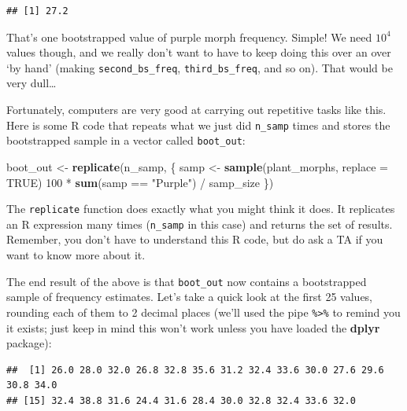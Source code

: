 \documentclass[]{book}
\newenvironment{Shaded}{\begin{snugshade}}{\end{snugshade}}
\newcommand{\KeywordTok}[1]{\textcolor[rgb]{0.13,0.29,0.53}{\textbf{{#1}}}}
\newcommand{\DataTypeTok}[1]{\textcolor[rgb]{0.13,0.29,0.53}{{#1}}}
\newcommand{\DecValTok}[1]{\textcolor[rgb]{0.00,0.00,0.81}{{#1}}}
\newcommand{\StringTok}[1]{\textcolor[rgb]{0.31,0.60,0.02}{{#1}}}
\newcommand{\OtherTok}[1]{\textcolor[rgb]{0.56,0.35,0.01}{{#1}}}
\newcommand{\NormalTok}[1]{{#1}}
\begin{document}
\begin{verbatim}
## [1] 27.2
\end{verbatim}

That's one bootstrapped value of purple morph frequency. Simple! We need
\(10^{4}\) values though, and we really don't want to have to keep doing
this over an over `by hand' (making \texttt{second\_bs\_freq},
\texttt{third\_bs\_freq}, and so on). That would be very dull\ldots{}

Fortunately, computers are very good at carrying out repetitive tasks
like this. Here is some R code that repeats what we just did
\texttt{n\_samp} times and stores the bootstrapped sample in a vector
called \texttt{boot\_out}:

\begin{Shaded}
\begin{Highlighting}[]
\NormalTok{boot_out <-}\StringTok{ }\KeywordTok{replicate}\NormalTok{(n_samp, \{}
  \NormalTok{samp <-}\StringTok{ }\KeywordTok{sample}\NormalTok{(plant_morphs, }\DataTypeTok{replace =} \OtherTok{TRUE}\NormalTok{)}
  \DecValTok{100} \NormalTok{*}\StringTok{ }\KeywordTok{sum}\NormalTok{(samp ==}\StringTok{ "Purple"}\NormalTok{) /}\StringTok{ }\NormalTok{samp_size}
\NormalTok{\})}
\end{Highlighting}
\end{Shaded}

The \texttt{replicate} function does exactly what you might think it
does. It replicates an R expression many times (\texttt{n\_samp} in this
case) and returns the set of results. Remember, you don't have to
understand this R code, but do ask a TA if you want to know more about
it.

The end result of the above is that \texttt{boot\_out} now contains a
bootstrapped sample of frequency estimates. Let's take a quick look at
the first 25 values, rounding each of them to 2 decimal places (we'll
used the pipe \texttt{\%\textgreater{}\%} to remind you it exists; just
keep in mind this won't work unless you have loaded the \textbf{dplyr}
package):

\begin{Shaded}
\end{Shaded}

\begin{verbatim}
##  [1] 26.0 28.0 32.0 26.8 32.8 35.6 31.2 32.4 33.6 30.0 27.6 29.6 30.8 34.0
## [15] 32.4 38.8 31.6 24.4 31.6 28.4 30.0 32.8 32.4 33.6 32.0
\end{verbatim}
\end{document}
